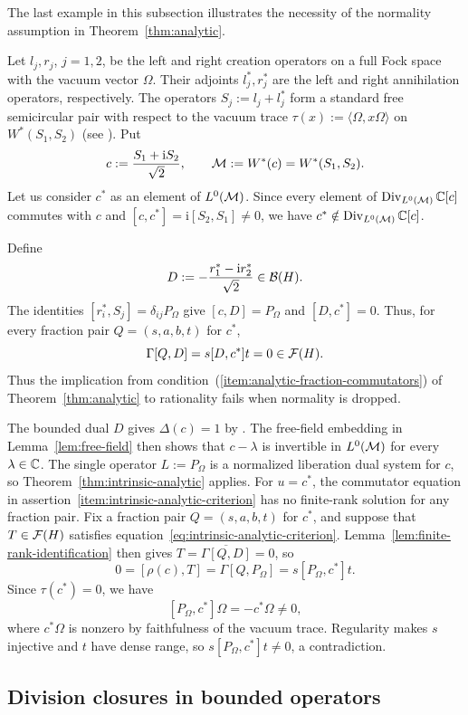 The last example in this subsection illustrates the necessity of the normality assumption in Theorem~\ref{thm:analytic}.

\begin{example}\label{ex:normality}
Let $l_j,r_j$, $j=1,2$, be the left and right creation operators on a full Fock space with the vacuum vector $\Omega$.
Their adjoints $l_j^*,r_j^*$ are the left and right annihilation operators, respectively.
The operators $S_j:=l_j+l_j^*$ form a standard free semicircular pair with respect to the vacuum trace $\tau(x):=\langle\Omega,x\Omega\rangle$ on $W^*(S_1,S_2)$ (see \cite[5.13]{Voi98}).
Put
\[
 c:=\frac{S_1+\mathrm iS_2}{\sqrt2},\qquad
 \mathcal M:=W^*(c)=W^*(S_1,S_2).
\]
Let us consider $c^*$ as an element of $L^0(\mathcal M)$.
Since every element of $\operatorname{Div}_{L^0(\mathcal M)}\mathbb C[c]$ commutes with $c$ and $[c,c^*]=\mathrm i[S_2,S_1]\ne0$, we have $c^*\notin\operatorname{Div}_{L^0(\mathcal M)}\mathbb C[c]$.

Define
\[
 D:=-\frac{r_1^*-\mathrm i r_2^*}{\sqrt2}\in\mathcal B(H).
\]
The identities $[r_i^*,S_j]=\delta_{ij}P_\Omega$ give $[c,D]=P_\Omega$ and $[D,c^*]=0$.
Thus, for every fraction pair $Q=(s,a,b,t)$ for $c^*$,
\[
 \Gamma[Q,D]=s[D,c^*]t=0\in\mathcal F(H).
\]
Thus the implication from condition~\textup{(\ref{item:analytic-fraction-commutators})} of Theorem~\ref{thm:analytic} to rationality fails when normality is dropped.

The bounded dual $D$ gives $\Delta(c)=1$ by \cite[Proposition~6.2]{MSY23}.
The free-field embedding in Lemma~\ref{lem:free-field} then shows that $c-\lambda$ is invertible in $L^0(\mathcal M)$ for every $\lambda\in\mathbb C$.
The single operator $L:=P_\Omega$ is a normalized liberation dual system for $c$, so Theorem~\ref{thm:intrinsic-analytic} applies.
For \(u=c^*\), the commutator equation in assertion~\eqref{item:intrinsic-analytic-criterion} has no finite-rank solution for any fraction pair.
Fix a fraction pair $Q=(s,a,b,t)$ for $c^*$, and suppose that $T\in\mathcal F(H)$ satisfies equation~\eqref{eq:intrinsic-analytic-criterion}.
Lemma~\ref{lem:finite-rank-identification} then gives $T=\overline{\Gamma[Q,D]}=0$, so
\[
 0=[\rho(c),T]=\Gamma[Q,P_\Omega]=s[P_\Omega,c^*]t.
\]
Since $\tau(c^*)=0$, we have
\[
 [P_\Omega,c^*]\Omega=-c^*\Omega\ne0,
\]
where $c^*\Omega$ is nonzero by faithfulness of the vacuum trace.
Regularity makes $s$ injective and $t$ have dense range, so $s[P_\Omega,c^*]t\ne0$, a contradiction.

\end{example}

\subsection{Division closures in bounded operators}\label{subsec:bounded-division-closures}

